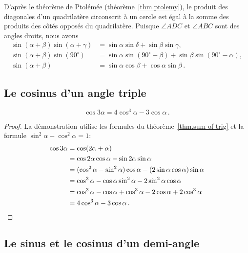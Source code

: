 D'après le théorème de Ptolémée (théorème~\ref{thm.ptolemy}), le produit des diagonales d'un quadrilatère circonscrit à un cercle est égal à la somme des produits des côtés opposés du quadrilatère. Puisque $\angle ADC$ et $\angle ABC$ sont des angles droits, nous avons 
\begin{align*}
\sin (\alpha+\beta)\sin(\alpha+\gamma)&=
\sin \alpha \sin\delta + \sin \beta\sin \gamma,\\
\sin (\alpha+\beta)\sin(90^\circ)&=
\sin \alpha \sin(90^\circ-\beta) + \sin \beta\sin (90^\circ-\alpha),\\
\sin (\alpha+\beta)&=\sin\alpha\cos\beta+\cos\alpha\sin \beta\,. \tag*{\qed}
\end{align*}



\subsection{Le cosinus d'un angle triple}\label{s.cosine}

\begin{theorem}\label{thm.triple-angle}
\[
\cos 3\alpha=4\cos^3\alpha -3\cos\alpha\,.
\]
\end{theorem}
\begin{proof}
La démonstration utilise les formules du théorème~\ref{thm.sum-of-trig} et la formule 
 $\sin^2\alpha+\cos^2\alpha=1$:
\begin{align*}
\cos 3\alpha &= \cos (2\alpha +\alpha)\\
&= \cos 2\alpha\cos\alpha - \sin 2\alpha\sin\alpha\\
&= (\cos^2\alpha -\sin^2\alpha)\cos\alpha - (2\sin\alpha\cos\alpha)\sin\alpha\\
&=\cos^3\alpha - \cos\alpha\sin^2\alpha -2\sin^2\alpha\cos\alpha\\
&=\cos^3\alpha - \cos\alpha +\cos^3\alpha -2\cos\alpha+2\cos^3\alpha\\
&=4\cos^3\alpha -3\cos\alpha\,.\qedhere
\end{align*}
\end{proof}


\subsection{Le sinus et le cosinus d'un demi-angle}\label{s.sine-cosine-half}

